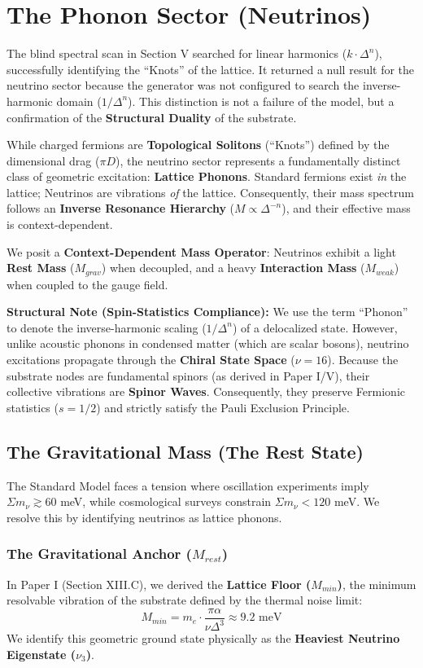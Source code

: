 \section{The Phonon Sector (Neutrinos)}

The blind spectral scan in Section V searched for linear harmonics ($k \cdot \Delta^n$), successfully identifying the ``Knots'' of the lattice. It returned a null result for the neutrino sector because the generator was not configured to search the inverse-harmonic domain ($1/\Delta^n$). This distinction is not a failure of the model, but a confirmation of the \textbf{Structural Duality} of the substrate.

While charged fermions are \textbf{Topological Solitons} (``Knots'') defined by the dimensional drag ($\pi D$), the neutrino sector represents a fundamentally distinct class of geometric excitation: \textbf{Lattice Phonons}. Standard fermions exist \textit{in} the lattice; Neutrinos are vibrations \textit{of} the lattice. Consequently, their mass spectrum follows an \textbf{Inverse Resonance Hierarchy} ($M \propto \Delta^{-n}$), and their effective mass is context-dependent.

We posit a \textbf{Context-Dependent Mass Operator}: Neutrinos exhibit a light \textbf{Rest Mass} ($M_{grav}$) when decoupled, and a heavy \textbf{Interaction Mass} ($M_{weak}$) when coupled to the gauge field.

\textbf{Structural Note (Spin-Statistics Compliance):} We use the term ``Phonon'' to denote the inverse-harmonic scaling ($1/\Delta^n$) of a delocalized state. However, unlike acoustic phonons in condensed matter (which are scalar bosons), neutrino excitations propagate through the \textbf{Chiral State Space} ($\nu=16$). Because the substrate nodes are fundamental spinors (as derived in Paper I/V), their collective vibrations are \textbf{Spinor Waves}. Consequently, they preserve Fermionic statistics ($s=1/2$) and strictly satisfy the Pauli Exclusion Principle.

\subsection{The Gravitational Mass (The Rest State)}

The Standard Model faces a tension where oscillation experiments imply $\Sigma m_\nu \gtrsim 60$ meV, while cosmological surveys constrain $\Sigma m_\nu < 120$ meV. We resolve this by identifying neutrinos as lattice phonons.

\subsubsection{The Gravitational Anchor (\texorpdfstring{$M_{rest}$}{Mrest})}
In Paper I (Section XIII.C), we derived the \textbf{Lattice Floor ($M_{min}$)}, the minimum resolvable vibration of the substrate defined by the thermal noise limit:
\begin{equation}
    M_{min} = m_e \cdot \frac{\pi \alpha}{\nu \Delta^3} \approx 9.2 \text{ meV}
\end{equation}
We identify this geometric ground state physically as the \textbf{Heaviest Neutrino Eigenstate ($\nu_3$)}.

